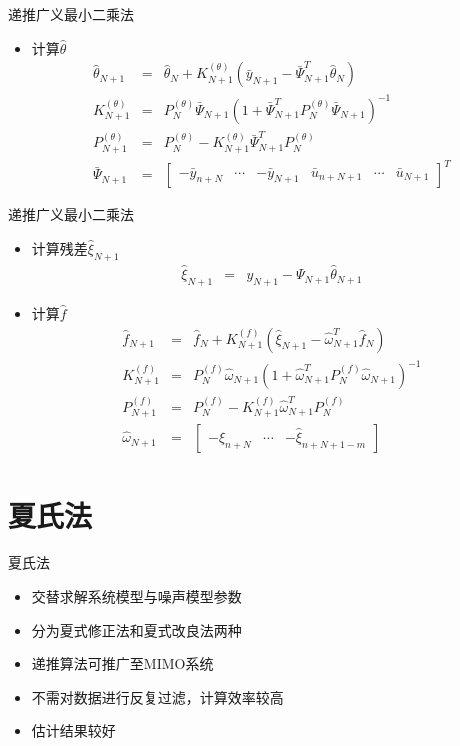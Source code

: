 \begin{frame}{递推广义最小二乘法}
\begin{itemize}
\item 计算$\hat\theta$
\begin{eqnarray*}
\hat\theta_{N+1} &=& \hat\theta_N+K_{N+1}^{(\theta)}(\bar y_{N+1}-\bar\Psi_{N+1}^T\hat\theta_N) \\
K_{N+1}^{(\theta)}&=& P_N^{(\theta)}\bar\Psi_{N+1}(1+\bar\Psi_{N+1}^T P_N^{(\theta)}\bar\Psi_{N+1})^{-1} \\
P_{N+1}^{(\theta)} &=& P_N^{(\theta)}-K_{N+1}^{(\theta)}\bar\Psi_{N+1}^T P_N^{(\theta)} \\
\bar\Psi_{N+1} &=& \begin{bmatrix}-\bar y_{n+N} &\cdots & -\bar y_{N+1} & \bar u_{n+N+1} &\cdots & \bar u_{N+1} \end{bmatrix}^T 
\end{eqnarray*}
\end{itemize}
\end{frame}

\begin{frame}{递推广义最小二乘法}
\begin{itemize}
\item 计算残差$\hat\xi_{N+1}$
\begin{eqnarray*}
\hat\xi_{N+1}&=& y_{N+1}-\Psi_{N+1}\hat\theta_{N+1}
\end{eqnarray*}
\item 计算$\hat f$
\begin{eqnarray*}
\hat f_{N+1} &=& \hat f_N+K_{N+1}^{(f)}(\hat\xi_{N+1}-\hat\omega_{N+1}^T\hat f_N) \\
K_{N+1}^{(f)}&=& P_N^{(f)}\hat\omega_{N+1}(1+\hat\omega_{N+1}^T P_N^{(f)}\hat\omega_{N+1})^{-1} \\
P_{N+1}^{(f)} &=& P_N^{(f)}-K_{N+1}^{(f)}\hat\omega_{N+1}^T P_N^{(f)}  \\
\hat\omega_{N+1} &=& \begin{bmatrix}-\hat\xi_{n+N} &\cdots & -\hat\xi_{n+N+1-m}\end{bmatrix}
\end{eqnarray*}
\end{itemize}
\end{frame}

\section{夏氏法}

\begin{frame}{夏氏法}
\begin{itemize}
\item  交替求解系统模型与噪声模型参数
\item  分为夏式修正法和夏式改良法两种
\item  递推算法可推广至MIMO系统
\item  不需对数据进行反复过滤，计算效率较高
\item  估计结果较好
\end{itemize}
\end{frame}


